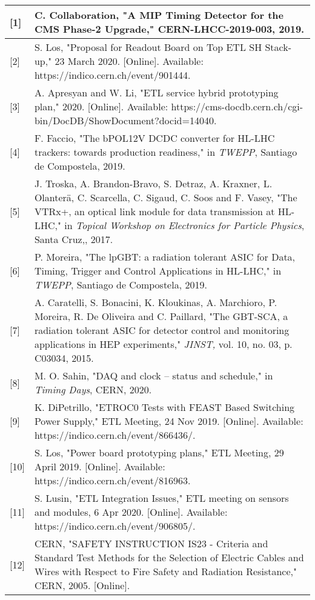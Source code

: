 \documentclass[11pt]{article}
\begin{document}
\begin{longtable}[]{@{}ll@{}}
{[}1{]} & C. Collaboration, "A MIP Timing Detector for the CMS Phase-2 Upgrade," CERN-LHCC-2019-003, 2019.\\
\midrule
\endhead
{[}2{]} & S. Los, "Proposal for Readout Board on Top ETL SH Stack-up," 23 March 2020. {[}Online{]}. Available: https://indico.cern.ch/event/901444.\\
{[}3{]} & A. Apresyan and W. Li, "ETL service hybrid prototyping plan," 2020. {[}Online{]}. Available: https://cms-docdb.cern.ch/cgi-bin/DocDB/ShowDocument?docid=14040.\\
{[}4{]} & F. Faccio, "The bPOL12V DCDC converter for HL-LHC trackers: towards production readiness," in \emph{TWEPP}, Santiago de Compostela, 2019.\\
{[}5{]} & J. Troska, A. Brandon-Bravo, S. Detraz, A. Kraxner, L. Olanterä, C. Scarcella, C. Sigaud, C. Soos and F. Vasey, "The VTRx+, an optical link module for data transmission at HL-LHC," in \emph{Topical Workshop on Electronics for Particle Physics}, Santa Cruz,, 2017.\\
{[}6{]} & P. Moreira, "The lpGBT: a radiation tolerant ASIC for Data, Timing, Trigger and Control Applications in HL-LHC," in \emph{TWEPP}, Santiago de Compostela, 2019.\\
{[}7{]} & A. Caratelli, S. Bonacini, K. Kloukinas, A. Marchioro, P. Moreira, R. De Oliveira and C. Paillard, "The GBT-SCA, a radiation tolerant ASIC for detector control and monitoring applications in HEP experiments," \emph{JINST,} vol. 10, no. 03, p. C03034, 2015.\\
{[}8{]} & M. O. Sahin, "DAQ and clock -- status and schedule," in \emph{Timing Days}, CERN, 2020.\\
{[}9{]} & K. DiPetrillo, "ETROC0 Tests with FEAST Based Switching Power Supply," ETL Meeting, 24 Nov 2019. {[}Online{]}. Available: https://indico.cern.ch/event/866436/.\\
{[}10{]} & S. Los, "Power board prototyping plans," ETL Meeting, 29
April 2019. {[}Online{]}. Available:
https://indico.cern.ch/event/816963.\\
{[}11{]} & S. Lusin, "ETL Integration Issues," ETL meeting on sensors
and modules, 6 Apr 2020. {[}Online{]}. Available:
https://indico.cern.ch/event/906805/.\\
{[}12{]} & CERN, "SAFETY INSTRUCTION IS23 - Criteria and Standard Test
Methods for the Selection of Electric Cables and Wires with Respect to
Fire Safety and Radiation Resistance," CERN, 2005. {[}Online{]}.

\end{longtable}
\end{document}

